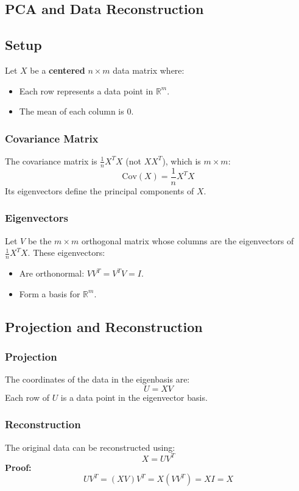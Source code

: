 \begin{notechapter}
\chapter{PCA and Data Reconstruction}\label{ch:pca-reconstruction}

\section{Setup}
Let \( X \) be a \textbf{centered} \( n \times m \) data matrix where:
\begin{itemize}
  \item Each row represents a data point in \( \mathbb{R}^m \).
  \item The mean of each column is \( 0 \).
\end{itemize}

\subsection{Covariance Matrix}
The covariance matrix is \( \frac{1}{n}X^T X \) (not \( XX^T \)),
which is \( m \times m \):
\[
  \text{Cov}(X) = \frac{1}{n}X^T X
\]
Its eigenvectors define the principal components of \( X \).

\subsection{Eigenvectors}
Let \( V \) be the \( m \times m \) orthogonal matrix whose columns
are the eigenvectors of \( \frac{1}{n}X^T X \). These eigenvectors:
\begin{itemize}
  \item Are orthonormal: \( VV^T = V^T V = I \).
  \item Form a basis for \( \mathbb{R}^m \).
\end{itemize}

\section{Projection and Reconstruction}
\subsection{Projection}
The coordinates of the data in the eigenbasis are:
\[
  U = X V
\]
Each row of \( U \) is a data point in the eigenvector basis.

\subsection{Reconstruction}
The original data can be reconstructed using:
\[
  X = U V^T
\]
\textbf{Proof:}
\[
  U V^T = (X V)V^T = X (V V^T) = X I = X
\]


\end{notechapter}
